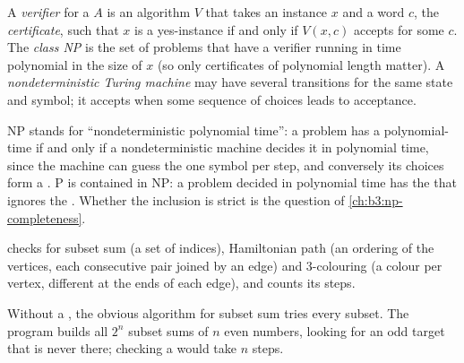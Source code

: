 \begin{definition}\label{def:b3:complexity-classes:np}
A \emph{verifier} for a  $A$ is an algorithm $V$ that takes an instance $x$ and a word $c$, the \emph{certificate}, such that $x$ is a yes-instance if and only if $V(x, c)$ accepts for some $c$. The \emph{class NP} is the set of problems that have a verifier running in time polynomial in the size of $x$ (so only certificates of polynomial length matter). A \emph{nondeterministic Turing machine} may have several transitions for the same state and symbol; it accepts when some sequence of choices leads to acceptance.
\end{definition}

NP stands for ``nondeterministic polynomial time'': a problem has a polynomial-time  if and only if a nondeterministic machine decides it in polynomial time, since the machine can guess the  one symbol per step, and conversely its choices form a . P is contained in NP: a problem decided in polynomial time has the  that ignores the . Whether the inclusion is strict is the question of \cref{ch:b3:np-completeness}.

 checks  for subset sum (a set of indices), Hamiltonian path (an ordering of the vertices, each consecutive pair joined by an edge) and 3-colouring (a colour per vertex, different at the ends of each edge), and counts its steps.

\label{lst:b3:complexity-classes:verifiers}

\label{out:b3:complexity-classes:verifiers}

Without a , the obvious algorithm for subset sum tries every subset. The program  builds all $2^n$ subset sums of $n$ even numbers, looking for an odd target that is never there; checking a  would take $n$ steps.

